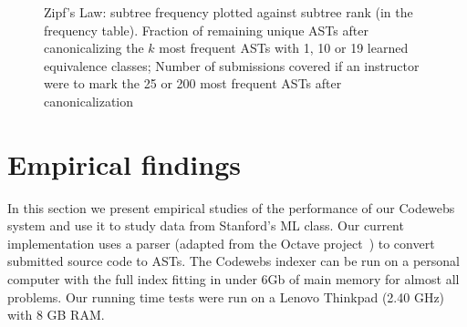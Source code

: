 \begin{figure}[t!]
\center
{}

\caption{
Zipf's Law: subtree frequency plotted against subtree rank (in the frequency table). %
 Fraction of remaining unique ASTs after canonicalizing the $k$ most frequent ASTs with 1, 10 or 19 learned equivalence classes;
 Number of submissions covered if an instructor were to mark the 25 or 200 most frequent ASTs after canonicalization
}

\label{fig:zipfreduction}
\end{figure}

\section{Empirical findings}\label{sec:evaluation}
In this section we present  empirical studies
of the performance of our Codewebs system and use it to study data from Stanford's ML class.
Our current implementation uses a parser (adapted from the Octave project~\cite{eaton97}) to convert
submitted source code to ASTs.   The Codewebs indexer can be run on a personal
computer with the full index fitting in under 6Gb of main memory for almost all problems.
Our running time tests were run on a %
Lenovo Thinkpad 
(2.40 GHz) with 8 GB RAM.


